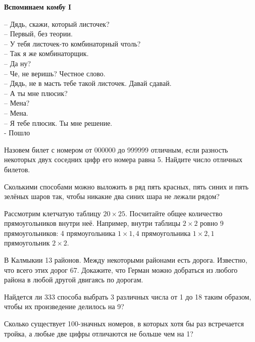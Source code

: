 \centerline{\bf \Huge Вспоминаем комбу I}

\begin{flushright}
        \scriptsize{– Дядь, скажи, который листочек?\\
                    – Первый, без теории.\\
                    – У тебя листочек-то комбинаторный чтоль?\\
                    – Так я же комбинаторщик.\\
                    – Да ну?\\
                    – Че, не веришь? Честное слово.\\
                    – Дядь, не в масть тебе такой листочек. Давай сдавай.\\
                    – А ты мне плюсик? \\
                    – Мена?\\
                    – Мена.\\
                    – Я тебе плюсик. Ты мне решение.\\
                    - Пошло}
\end{flushright}

Назовем билет с номером от 000000 до 999999 отличным, если разность некоторых двух соседних цифр его номера равна 5. Найдите число отличных билетов.

Сколькими способами можно выложить в ряд пять красных, пять синих и пять зелёных шаров так, чтобы никакие два синих шара не лежали рядом?

Рассмотрим клетчатую таблицу $20 \times 25$. Посчитайте общее количество прямоугольников внутри неё. Например, внутри таблицы $2 \times 2$ ровно 9 прямоугольников: 4 прямоугольника $1 \times 1,4$ прямоугольника $1 \times 2,1$ прямоугольник $2 \times 2$.

В Калмыкии 13 районов. Между некоторыми районами есть дорога. Известно, что всего этих дорог 67. Докажите, что Герман можно добраться из любого района в любой другой двигаясь по дорогам.

Найдется ли 333 способа выбрать 3 различных числа от 1 до 18 таким образом, чтобы их произведение делилось на 9?

Сколько существует 100-значных номеров, в которых хотя бы раз встречается тройка, а любые две цифры отличаются не больше чем на 1?